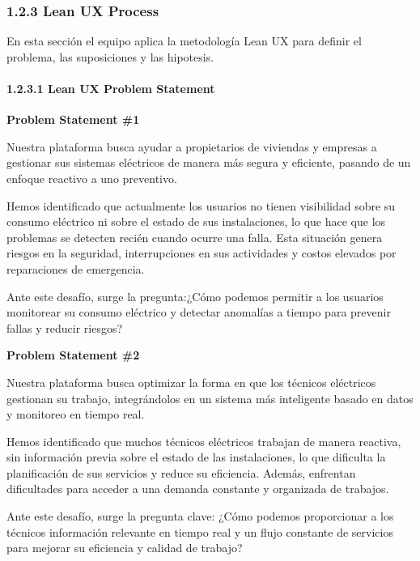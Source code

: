 \subsubsection{1.2.3 Lean UX
Process}\label{report__10-cap1-introduccion.md__lean-ux-process}

En esta sección el equipo aplica la metodología Lean UX para definir el
problema, las suposiciones y las hipotesis.

\paragraph{1.2.3.1 Lean UX Problem
Statement}\label{report__10-cap1-introduccion.md__lean-ux-problem-statement}

\hfill\break

\textbf{Problem Statement \#1}

Nuestra plataforma busca ayudar a propietarios de viviendas y empresas a
gestionar sus sistemas eléctricos de manera más segura y eficiente,
pasando de un enfoque reactivo a uno preventivo.

Hemos identificado que actualmente los usuarios no tienen visibilidad
sobre su consumo eléctrico ni sobre el estado de sus instalaciones, lo
que hace que los problemas se detecten recién cuando ocurre una falla.
Esta situación genera riesgos en la seguridad, interrupciones en sus
actividades y costos elevados por reparaciones de emergencia.

Ante este desafío, surge la pregunta:¿Cómo podemos permitir a los
usuarios monitorear su consumo eléctrico y detectar anomalías a tiempo
para prevenir fallas y reducir riesgos?

\textbf{Problem Statement \#2}

Nuestra plataforma busca optimizar la forma en que los técnicos
eléctricos gestionan su trabajo, integrándolos en un sistema más
inteligente basado en datos y monitoreo en tiempo real.

Hemos identificado que muchos técnicos eléctricos trabajan de manera
reactiva, sin información previa sobre el estado de las instalaciones,
lo que dificulta la planificación de sus servicios y reduce su
eficiencia. Además, enfrentan dificultades para acceder a una demanda
constante y organizada de trabajos.

Ante este desafío, surge la pregunta clave: ¿Cómo podemos proporcionar a
los técnicos información relevante en tiempo real y un flujo constante
de servicios para mejorar su eficiencia y calidad de trabajo?

